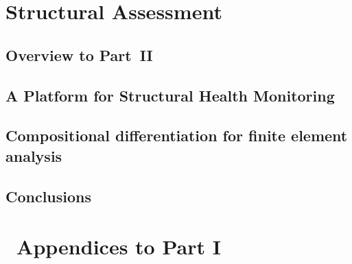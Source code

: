 \begin{Notation}[section]

\clearpage


\part{Structural Assessment}

\chapter{Overview to Part~II}\label{sec:Part-II}

\clearpage


% 


\chapter{A Platform for Structural Health Monitoring}\label{sec:irie}

\clearpage

\clearpage 


\chapter[Xara%
]{\Xara{}
}\label{ch:xara}
% 
\clearpage

\chapter{Compositional differentiation for finite element analysis}
\label{ch:autodiff}

\clearpage



\chapter{Conclusions}

\clearpage

\part{~Appendices to Part I}
\begin{appendices}
\clearpage

\end{appendices}
\end{Notation}
